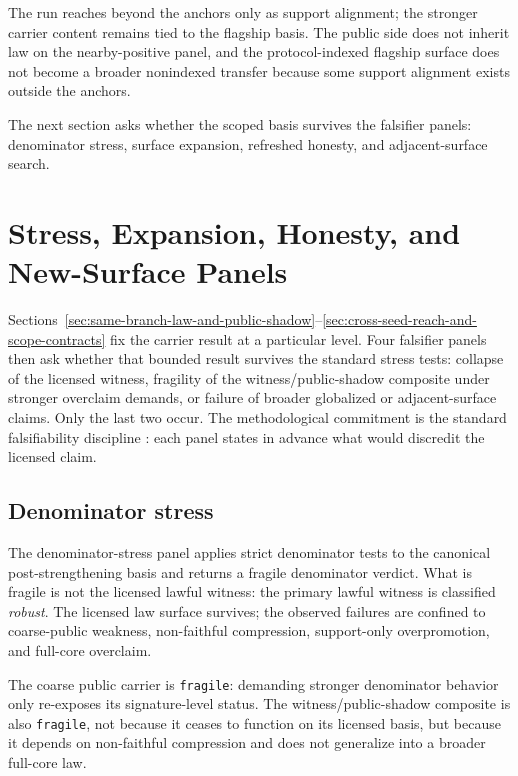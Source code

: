 \documentclass[11pt]{article}
\theoremstyle{definition}
\begin{document}
The run reaches beyond the anchors only as support alignment; the stronger carrier
content remains tied to the flagship basis. The public side does not inherit law on
the nearby-positive panel, and the protocol-indexed flagship surface does not become a
broader nonindexed transfer because some support alignment exists outside the anchors.

The next section asks whether the scoped basis survives the falsifier panels:
denominator stress, surface expansion, refreshed honesty, and adjacent-surface search.
 \section{Stress, Expansion, Honesty, and New-Surface Panels}
\label{sec:stress-expansion-honesty-new-surface}

Sections~\ref{sec:same-branch-law-and-public-shadow}--\ref{sec:cross-seed-reach-and-scope-contracts}
fix the carrier result at a particular level. Four falsifier panels then ask whether
that bounded result survives the standard stress tests: collapse of the licensed
witness, fragility of the witness/public-shadow composite under stronger overclaim
demands, or failure of broader globalized or adjacent-surface claims. Only the last
two occur. The methodological commitment is the standard falsifiability discipline
\citep{Popper1959}: each panel states in advance what would discredit the licensed
claim.

\subsection{Denominator stress}

The denominator-stress panel applies strict denominator tests to the canonical
post-strengthening basis and returns a fragile denominator verdict. What is fragile is
not the licensed lawful witness: the primary lawful witness is classified
\emph{robust}. The licensed law surface survives; the observed failures are confined
to coarse-public weakness, non-faithful compression, support-only overpromotion, and
full-core overclaim.

The coarse public carrier is \texttt{fragile}: demanding stronger denominator behavior
only re-exposes its signature-level status. The witness/public-shadow composite is
also \texttt{fragile}, not because it ceases to function on its licensed basis, but
because it depends on non-faithful compression and does not generalize into a broader
full-core law.
\end{document}
